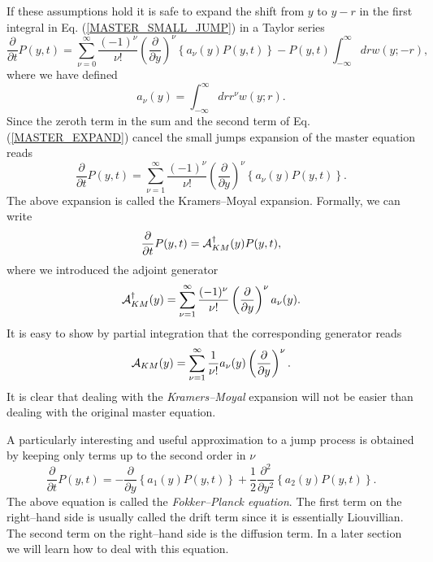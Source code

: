 If these assumptions hold it is safe to expand the shift from $y$
to $y-r$ in the first integral in 
Eq. (\ref{MASTER_SMALL_JUMP}) in a Taylor series
\begin{equation}
\label{MASTER_EXPAND}
\frac{\partial}{\partial t} P(y,t) = \sum_{\nu=0}^{\infty}
   \frac{(-1)^{\nu}}{\nu!} \left( \frac{\partial}{\partial y} 
   \right)^{\nu}
    \left\{  a_{\nu}(y) P(y,t) \right\}
    - P(y,t) \int_{-\infty}^{\infty} dr w(y;-r),
\end{equation}
where we have defined
\begin{equation*}
a_{\nu}(y) = \int_{-\infty}^{\infty} dr r^{\nu} w(y;r).
\end{equation*}
Since the zeroth term in the sum and the second term of 
Eq. (\ref{MASTER_EXPAND}) cancel the small jumps expansion 
of the master equation reads
\begin{equation}
\frac{\partial}{\partial t} P(y,t) = \sum_{\nu=1}^{\infty}
   \frac{(-1)^{\nu}}{\nu!} \left( \frac{\partial}{\partial y} 
   \right)^{\nu}
    \left\{  a_{\nu}(y) P(y,t) \right\}.
\end{equation}
The above expansion is called the Kramers--Moyal expansion. 
Formally, we can write
\begin{equation}
\frac{\partial}{\partial t} P(y,t) = {\cal{A}}_{KM}^{\dagger}(y)
         P(y,t),
\end{equation}
where we introduced the adjoint generator
\begin{equation*}
{\cal{A}}_{KM}^{\dagger}(y) = \sum_{\nu=1}^{\infty}
   \frac{(-1)^{\nu}}{\nu!} \left( \frac{\partial}{\partial y} 
   \right)^{\nu}
     a_{\nu}(y).
\end{equation*}
It is easy to show by partial integration that the corresponding
generator  reads
\begin{equation*}
{\cal{A}}_{KM}(y) = \sum_{\nu=1}^{\infty}
   \frac{1}{\nu!}  a_{\nu}(y)
    \left( \frac{\partial}{\partial y} 
   \right)^{\nu}.
\end{equation*}
It is clear that dealing with the {\em Kramers--Moyal} expansion will 
not be easier than dealing with the original master equation.

A particularly interesting and useful approximation to a jump process is 
obtained by keeping only terms up to the second order in $\nu$
\begin{equation}
\label{FOKKER_PLANCK}
\frac{\partial}{\partial t} P(y,t) =
-\frac{\partial}{\partial y} \left\{ a_1(y) P(y,t) \right\}
   + \frac{1}{2} \frac{\partial^2}{\partial y^2} 
      \left\{ a_2(y) P(y,t) \right\}.
\end{equation}
The above equation is called the {\em Fokker--Planck equation}.
The first term on the right--hand side is usually called the drift
term since it is essentially Liouvillian. The second term
on the right--hand side is the diffusion term. In a later section
we will learn how to deal with this equation.

